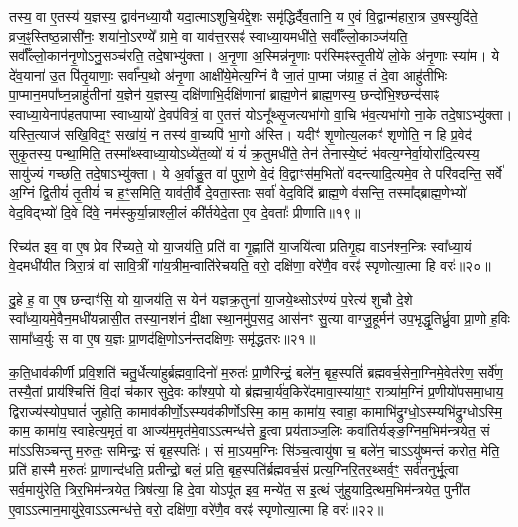 तस्य॒ वा ए॒तस्य॑ य॒ज्ञस्य॒ द्वाव॑नध्या॒यौ यदा॒त्माऽशुचि॒र्यद्दे॒शः समृ॑द्धिर्दैव॒तानि॒ य ए॒वं वि॒द्वान्म॑हारा॒त्र उ॒षस्युदि॑ते॒ व्रज॒ꣴ॒स्तिष्ठ॒न्ना\-सी॑नः॒ शया॑नो॒ऽरण्ये᳚ ग्रामे॒ वा याव॑त्त॒रसꣴ॑ स्वाध्या॒यमधी॑ते॒ सर्वाँ᳚ल्लो॒काञ्ज॑यति॒ सर्वाँ᳚ल्लो॒कान॑नृ॒णोऽनु॒\-सञ्च॑रति॒ तदे॒षाभ्यु॑क्ता। 
अ॒नृ॒णा अ॒स्मिन्न॑नृ॒णाः पर॑स्मिꣴ\-स्तृ॒तीये॑ लो॒के अ॑नृ॒णाः स्या॑म। 
ये दे॑व॒याना॑ उ॒त पि॑तृ॒याणाः॒ सर्वा᳚न्प॒थो अ॑नृ॒णा आक्षी॑ये॒मेत्य॒ग्निं वै जा॒तं पा॒प्मा ज॑ग्राह॒ तं दे॒वा आहु॑तीभिः पा॒प्मान॒मपा᳚घ्न॒न्नाहु॑तीनां य॒ज्ञेन॑ य॒ज्ञस्य॒ दक्षि॑णाभि॒र्दक्षि॑णानां ब्राह्म॒णेन॑ ब्राह्म॒णस्य॒ छन्दो॑भि॒श्छन्द॑साꣴ स्वाध्या॒येनाप॑हतपाप्मा स्वाध्या॒यो॑ दे॒वप॑वित्रं॒ वा ए॒तत्तं योऽनू᳚थ्सृ॒जत्यभा॑गो वा॒चि भ॑व॒त्यभा॑गो ना॒के तदे॒षाऽभ्यु॑क्ता। 
यस्ति॒त्याज॑ सखि॒विद॒ꣳ॒ सखा॑यं॒ न तस्य॑ वा॒च्यपि॑ भा॒गो अ॑स्ति। 
यदीꣳ॑ शृ॒णोत्य॒लकꣳ॑ शृणोति॒ न हि प्र॒वेद॑ सुकृ॒तस्य॒ पन्था॒मिति॒ तस्मा᳚थ्स्वाध्या॒योऽध्ये॑त॒व्यो॑ यं यं॑ क्र॒तुमधी॑ते॒ तेन॑ तेनास्ये॒ष्टं भ॑वत्य॒ग्नेर्वा॒योरा॑दि॒त्यस्य॒ सायु॑ज्यं गच्छति॒ तदे॒षाऽभ्यु॑क्ता। 
ये अ॒र्वाङु॒त वा॑ पुरा॒णे वे॒दं वि॒द्वाꣳस॑म॒भितो॑ वदन्त्यादि॒त्यमे॒व ते परि॑वदन्ति॒ सर्वे॑ अ॒ग्निं द्वि॒तीयं॑ तृ॒तीयं॑ च ह॒ꣳ॒समिति॒ याव॑ती॒र्वै दे॒वता॒स्ताः सर्वा॑ वेद॒विदि॑ ब्राह्म॒णे व॑सन्ति॒ तस्मा᳚द्ब्राह्म॒णेभ्यो॑ वेद॒विद्भ्यो॑ दि॒वे दि॑वे॒ नम॑स्कुर्या॒न्नाश्ली॒लं की᳚र्तयेदे॒ता ए॒व दे॒वताः᳚ प्रीणाति॥१९॥
\anuvakamend

रिच्य॑त इव॒ वा ए॒ष प्रेव रि॑च्यते॒ यो या॒जय॑ति॒ प्रति॑ वा गृ॒ह्णाति॑ या॒जयि॑त्वा प्रतिगृ॒ह्य वाऽन॑श्न॒न्त्रिः स्वा᳚ध्या॒यं वे॒दमधी॑यीत त्रिरा॒त्रं वा॑ सावि॒त्रीं गा॑य॒त्रीम॒न्वाति॑रेचयति॒ वरो॒ दक्षि॑णा॒ वरे॑णै॒व वरꣴ॑ स्पृणोत्या॒त्मा हि वरः॑॥२०॥
\anuvakamend

दु॒हे ह॒ वा ए॒ष छन्दाꣳ॑सि॒ यो या॒जय॑ति॒ स येन॑ यज्ञक्र॒तुना॑ या॒जये॒थ्सोऽर॑ण्यं प॒रेत्य॑ शुचौ दे॒शे स्वा᳚ध्या॒यमे॒वैन॒मधी॑यन्नासी॒त तस्या॒नश॑नं दी॒क्षा स्था॒नमु॑प॒सद॒ आस॑नꣳ सु॒त्या वाग्जु॒हूर्मन॑ उप॒भृद्धृ॒तिर्ध्रु॒वा प्रा॒णो ह॒विः सामा᳚ध्व॒र्युः स वा ए॒ष य॒ज्ञः प्रा॒णद॑क्षि॒णोऽन॑न्त\-दक्षिणः॒ समृ॑द्धतरः॥२१॥
\anuvakamend


क॒ति॒धाव॑कीर्णी प्रवि॒शति॑ चतु॒र्धेत्या॑हुर्ब्रह्मवा॒दिनो॑ म॒रुतः॑ प्रा॒णैरिन्द्रं॒ बले॑न॒ बृह॒स्पतिं॑ ब्रह्मवर्च॒सेना॒ग्निमे॒वेत॑रेण॒ सर्वे॑ण॒ तस्यै॒तां प्राय॑श्चित्तिं वि॒दां च॑कार सुदे॒वः का᳚श्य॒पो यो ब्र॑ह्मचा॒र्य॑व॒किरे॑दमावा॒स्या॑या॒ꣳ॒ रात्र्या॑म॒ग्निं प्र॒णीयो॑पसमा॒धाय॒ द्विराज्य॑स्योप॒घातं॑ जुहोति॒ कामाव॑कीर्णो॒ऽस्म्यव॑कीर्णोऽस्मि॒ काम॒ कामा॑य॒ स्वाहा॒ कामाभि॑द्रुग्धो॒ऽस्म्यभि॑द्रुग्धोऽस्मि॒ काम॒ कामा॑य॒ स्वाहेत्य॒मृतं॒ वा आज्य॑म॒मृत॑मे॒वाऽऽत्मन्ध॑त्ते हु॒त्वा प्रय॑ताञ्ज॒लिः कवा॑तिर्यङ्ङ॒ग्निम॒भि\-म॑न्त्रयेत॒ सं मा॑ऽऽसिञ्चन्तु म॒रुतः॒ समिन्द्रः॒ सं बृह॒स्पतिः॑। 
सं मा॒ऽयम॒ग्निः सि॑ञ्च॒त्वायु॑षा च॒ बले॑न॒ चाऽऽयु॑ष्मन्तं करोत॒ मेति॒ प्रति॑ हास्मै म॒रुतः॑ प्रा॒णान्द॑धति॒ प्रतीन्द्रो॒ बलं॒ प्रति॒ बृह॒स्पति॑र्ब्रह्मवर्च॒सं प्रत्य॒ग्निरि॒तर॒थ्सर्व॒ꣳ॒ सर्व॑तनुर्भू॒त्वा सर्व॒मायु॑रेति॒ त्रिर॒भिम॑न्त्रयेत॒ त्रिष॑त्या॒ हि दे॒वा योऽपू॑त इव॒ मन्ये॑त॒ स इ॒त्थं जु॑हुयादि॒त्थम॒भिम॑न्त्रयेत॒ पुनी॑त ए॒वाऽऽत्मान॒मायु॑रे॒वाऽऽत्मन्ध॑त्ते॒ वरो॒ दक्षि॑णा॒ वरे॑णै॒व वरꣴ॑ स्पृणोत्या॒त्मा हि वरः॑॥२२॥
\anuvakamend

